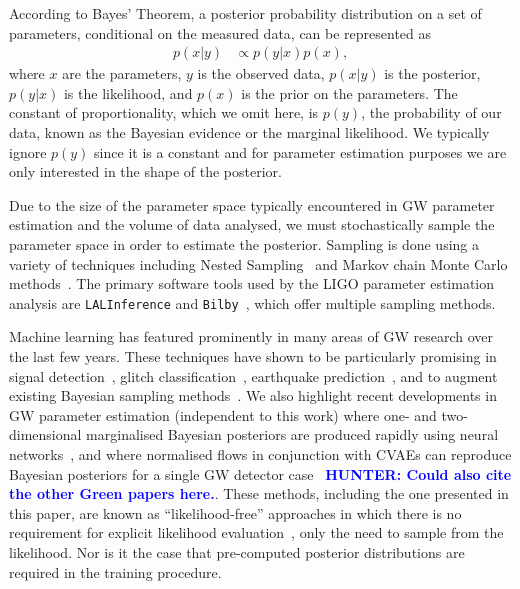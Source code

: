 \documentclass[%
showpacs,
nofootinbib,
 amsmath,amssymb,
 aps,
 twocolumn,
 prl,
 reprint,
floatfix,
]{revtex4-1}
\newcommand{\hunter}[1]{\textbf{\textcolor{blue}{HUNTER: #1}}}
\begin{document}
%
%
According to Bayes' Theorem, a posterior probability distribution on a set of
parameters, conditional on the measured data, can be represented as
%
\begin{align}\label{eq:bayes_theorem} 
p(x|y) &\propto p(y|x) p(x), 
\end{align}
%
where $x$ are the parameters, $y$ is the observed data, $p(x|y)$ is the
posterior, $p(y|x)$ is the likelihood, and $p(x)$ is the prior on the
parameters. The constant of proportionality, which we omit here, is
$p(y)$, the probability of our data, known as the Bayesian evidence or the
marginal likelihood. We typically ignore $p(y)$ since it is a constant and for
parameter estimation purposes we are only interested in the shape of the
posterior.

%
%
Due to the size of the parameter space typically encountered in \ac{GW}
parameter estimation and the volume of data analysed, we must stochastically
sample the parameter space in order to estimate the posterior.  Sampling is
done using a variety of techniques including Nested
Sampling~\cite{skilling2006,cpnest,dynesty} and Markov chain Monte Carlo
methods~\cite{emcee,ptemcee}. The primary software tools used by the \ac{LIGO}
parameter estimation analysis are \texttt{LALInference} and
\texttt{Bilby}~\cite{1409.7215,1811.02042}, which offer multiple sampling
methods.  
  
%
%
Machine learning has featured prominently in many areas of \ac{GW} research
over the last few years. These techniques have shown to be particularly
promising in signal
detection~\cite{GEORGE201864,PhysRevLett.120.141103,GebKilParHarSch}, glitch
classification~\cite{0264-9381-34-6-064003}, earthquake
prediction~\cite{Coughlin_2017}, and to augment existing Bayesian sampling
methods~\cite{2012MNRAS.421..169G}. We also highlight recent developments
in \ac{GW} parameter estimation (independent to this work) where one- and
two-dimensional marginalised Bayesian posteriors are produced rapidly using
neural networks~\cite{2019arXiv190905966C}, and where normalised flows in
conjunction with \acp{CVAE} can reproduce Bayesian posteriors for a single
\ac{GW} detector case~\cite{2020arXiv200207656G} \hunter{Could also cite 
the other Green papers here.}. These methods, including the
one presented in this paper, are known as ``likelihood-free'' approaches in
which there is no requirement for explicit likelihood 
evaluation~\cite{Cranmer201912789}, only the need
to sample from the likelihood. Nor is it the case that pre-computed posterior
distributions are required in the training procedure.
\end{document}

